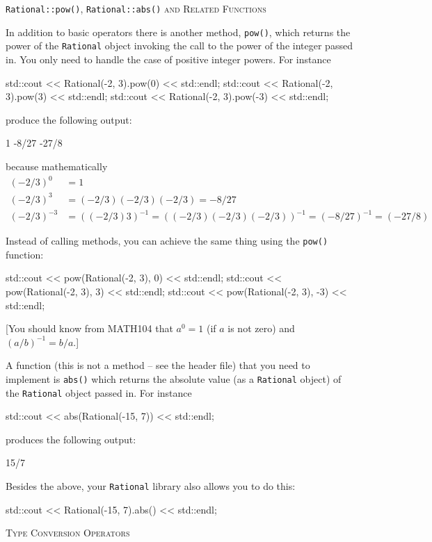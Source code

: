 \newpage
{\texttt{Rational::pow()}, \texttt{Rational::abs()}
  \textsc{and Related Functions}

In addition to basic operators there is another method, \texttt{pow()},
which returns the power of the \texttt{Rational} object invoking the call to
the power of the integer passed in.
You only need to handle the case of positive integer powers. For instance 
\begin{console}
std::cout << Rational(-2, 3).pow(0) << std::endl;
std::cout << Rational(-2, 3).pow(3) << std::endl;
std::cout << Rational(-2, 3).pow(-3) << std::endl;
\end{console}
produce the following output:
\begin{console}
1
-8/27
-27/8
\end{console}
because mathematically
\begin{align*}
  (-2/3)^0 &= 1 \\
  (-2/3)^3 &= (-2/3)(-2/3)(-2/3) = -8/27 \\
  (-2/3)^{-3} &= ((-2/3)3 )^{-1} = ((-2/3)(-2/3)(-2/3))^{-1}
  = (-8/27)^{-1} = (-27/8)
\end{align*}

Instead of calling methods, you can achieve the same thing using the
\texttt{pow()} function:
\begin{console}
std::cout << pow(Rational(-2, 3), 0) << std::endl;
std::cout << pow(Rational(-2, 3), 3) << std::endl;
std::cout << pow(Rational(-2, 3), -3) << std::endl;
\end{console}

[You should know from MATH104 that
$a^0 = 1$ (if $a$ is not zero) and $(a/b)^{-1}  = b/a$.] 

A function (this is not a method -- see the header file) that you need to
implement is \texttt{abs()} which returns the absolute value
(as a \texttt{Rational} object) of the \texttt{Rational}
object passed in. For instance 
\begin{console}
std::cout << abs(Rational(-15, 7)) << std::endl;
\end{console}
produces the following output:
\begin{console}
15/7
\end{console}
Besides the above, your \texttt{Rational} library also allows you
to do this:
\begin{console}
std::cout << Rational(-15, 7).abs() << std::endl;
\end{console}


\newpage
\textsc{Type Conversion Operators}

}
